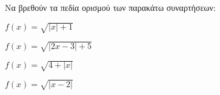 Να βρεθούν τα πεδία ορισμού των παρακάτω συναρτήσεων:
\begin{alist}
\item $ f(x)=\sqrt{|x|+1} $
\item $ f(x)=\sqrt{|2x-3|+5} $
\item $ f(x)=\sqrt{4+|x|} $
\item $ f(x)=\sqrt{|x-2|} $
\end{alist}
